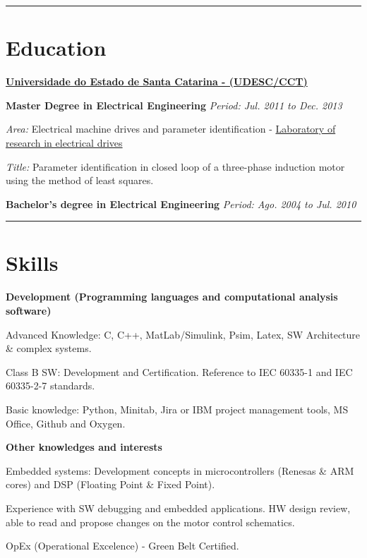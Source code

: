 \documentclass[10pt]{article}
\begin{document}
\blankline
\hrule

\section{Education}
\href{http://www.joinville.udesc.br/}{\textbf{Universidade do Estado de Santa Catarina - (UDESC/CCT)}}

\begin{outerlist}

\item[] \textbf{Master Degree in Electrical Engineering} \hfill \textit{Period: Jul. 2011 to Dec. 2013}
        \begin{innerlist}
          \item \textit{Area:} Electrical machine drives and parameter identification - \href{http://www2.joinville.udesc.br/~ppgeel/?page_id=34}{Laboratory of research in electrical drives}
          \item \textit{Title:} Parameter identification in closed loop of a three-phase induction motor using the method of least squares.
        \end{innerlist}
\end{outerlist}

\begin{outerlist}
\item[] \textbf{Bachelor's degree in Electrical Engineering}
			  \hfill \textit{Period: Ago. 2004 to Jul. 2010}	
			    
\blankline
\hrule
\end{outerlist}

\section{Skills}
%
\textbf{Development (Programming languages and computational analysis software)}
\begin{compactouterlist}
\item[] Advanced Knowledge: C, C++, MatLab/Simulink, Psim, Latex, SW Architecture \& complex systems.
\item[] Class B SW: Development and Certification. Reference to IEC 60335-1 and IEC 60335-2-7 standards.
\item[] Basic knowledge: Python, Minitab, Jira or IBM project management tools, MS Office, Github and Oxygen.
\end{compactouterlist}

\blankline

\textbf{Other knowledges and interests}
\begin{compactouterlist}
\item[] Embedded systems: Development concepts in microcontrollers (Renesas \& ARM cores) and DSP (Floating Point \& Fixed Point).
\item[] Experience with SW debugging and embedded applications. HW design review, able to read and propose changes on the motor control schematics.
\item[] OpEx (Operational Excelence) - Green Belt Certified.
\end{compactouterlist}
\end{document}
